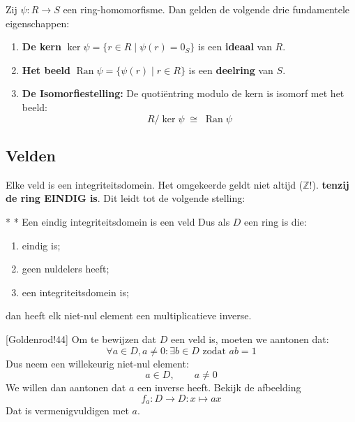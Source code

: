 Zij $\psi: R \to S$ een ring-homomorfisme. Dan gelden de volgende drie fundamentele eigenschappen:

\begin{enumerate}
    \item \textbf{De kern} $\ker\psi = \{r \in R \mid \psi(r) = 0_S\}$ is een \textbf{ideaal} van $R$.
    \item \textbf{Het beeld} $\operatorname{Ran}\psi = \{\psi(r) \mid r \in R\}$ is een \textbf{deelring} van $S$.
    \item \textbf{De Isomorfiestelling:} De quotiëntring modulo de kern is isomorf met het beeld:
    \begin{equation*}
        R/\ker\psi \;\cong\; \operatorname{Ran}\psi
    \end{equation*}
\end{enumerate}

\subsection{Velden}


Elke veld is een integriteitsdomein. Het omgekeerde geldt niet altijd ($\mathbb{Z}$!). \textbf{tenzij de ring EINDIG is}. Dit leidt tot de volgende stelling:

\begin{nicetheorem}*
    \nextpart[]*
    Een eindig integriteitsdomein is een veld \newline
    Dus als $D$ een ring is die:
    \begin{enumerate}
        \item eindig is;
        \item geen nuldelers heeft;
        \item een integriteitsdomein is;
    \end{enumerate}
    dan heeft elk niet-nul element een multiplicatieve inverse.
\end{nicetheorem}

[Goldenrod!44]
Om te bewijzen dat $D$ een veld is, moeten we aantonen dat:
\begin{equation*}
    \forall a \in D, a \neq 0 : \exists b \in D \text{ zodat } ab=1
\end{equation*}
Dus neem een willekeurig niet-nul element:
\begin{equation*}
    a \in D, \qquad a \neq 0
\end{equation*}
We willen dan aantonen dat $a$ een inverse heeft. Bekijk de afbeelding
\begin{equation*}
    f_a : D \to D : x \mapsto ax
\end{equation*}
Dat is vermenigvuldigen met $a$.

